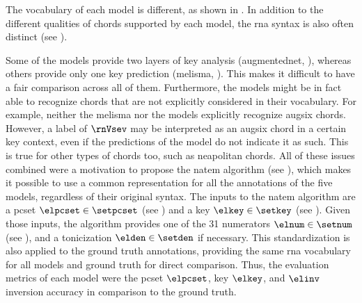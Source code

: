 
The vocabulary of each model is different, as shown in
. In addition to the different
qualities of chords supported by each model, the \gls{rna}
syntax is also often distinct (see
). 


Some of the models provide two layers of key analysis
(\gls{augmentednet}, \cite{micchi2021deep, chen2021attend}),
whereas others provide only one key prediction
(\gls{melisma}, \cite{mcleod2021modular}). This makes it
difficult to have a fair comparison across all of them.
Furthermore, the models might be in fact able to recognize
chords that are not explicitly considered in their
vocabulary. For example, neither the \gls{melisma} nor the
\textcite{mcleod2021modular} models explicitly recognize
\gls{augsix} chords. However, a label of $\rnVsev$ may be
interpreted as an \gls{augsix} chord in a certain key
context, even if the predictions of the model do not
indicate it as such. This is true for other types of chords
too, such as \gls{neapolitan} chords. All of these issues
combined were a motivation to propose the \gls{natem}
algorithm (see
), which
makes it possible to use a common representation for all the
annotations of the five models, regardless of their original
syntax. The inputs to the \gls{natem} algorithm are a
\gls{pcset} $\elpcset \in \setpcset$ (see
) and a key $\elkey
\in \setkey$ (see ).
Given those inputs, the algorithm provides one of the 31
numerators $\elnum \in \setnum$ (see
), and a
tonicization $\elden \in \setden$ if necessary. This
standardization is also applied to the ground truth
annotations, providing the same \gls{rna} vocabulary for all
models and ground truth for direct comparison. Thus, the
evaluation metrics of each model were the \gls{pcset}
$\elpcset$, key $\elkey$, and $\elinv$ inversion accuracy in
comparison to the ground truth.

